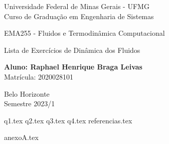 \documentclass[12pt]{scrartcl}
\begin{document}

\begin{titlepage}
    \begin{center}
        \begin{Large}
            Universidade Federal de Minas Gerais - UFMG\\
            Curso de Graduação em Engenharia de Sistemas\\

            \vspace{5.0cm}


            EMA255 - Fluidos e Termodinâmica Computacional

            \vspace{5.0cm}

            Lista de Exercícios de Dinâmica dos Fluidos
            \vspace*{1cm}

            \textbf{Aluno: Raphael Henrique Braga Leivas}\\
            \vspace*{1cm}
            Matrícula: 2020028101

            \vspace{7cm}

            Belo Horizonte\\
            \vspace*{1cm}
            Semestre 2023/1
        \end{Large}
    \end{center}
\end{titlepage}

\pagestyle{fancy}

\fancyhead{}
\fancyfoot{}

{q1.tex}
{q2.tex}
{q3.tex}
{q4.tex}
{referencias.tex}

\clearpage
\onecolumn
{anexoA.tex}
\end{document}
